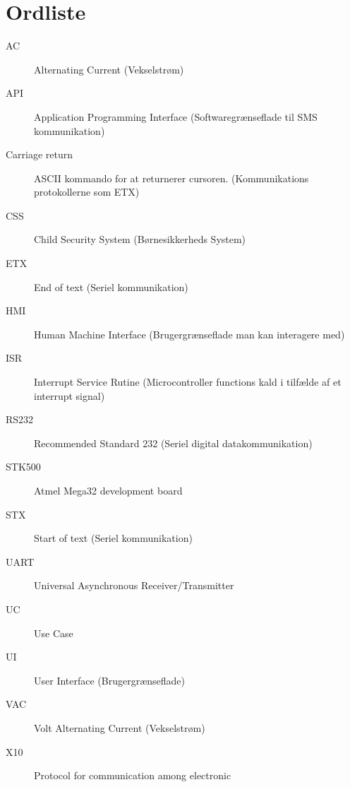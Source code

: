 \chapter{Ordliste}

\begin{description}

\item[AC] Alternating Current (Vekselstrøm)
\item[API] Application Programming Interface (Softwaregrænseflade til SMS kommunikation)
\item[Carriage return] ASCII kommando for at returnerer cursoren. (Kommunikations protokollerne som ETX)
\item[CSS] Child Security System (Børnesikkerheds System)
\item[ETX] End of text (Seriel kommunikation)
\item[HMI] Human Machine Interface (Brugergrænseflade man kan interagere med)
\item[ISR] Interrupt Service Rutine (Microcontroller functions kald i tilfælde af et interrupt signal)
\item[RS232] Recommended Standard 232 (Seriel digital datakommunikation)
\item[STK500] Atmel Mega32 development board
\item[STX] Start of text (Seriel kommunikation)
\item[UART] Universal Asynchronous Receiver/Transmitter
\item[UC] Use Case
\item[UI] User Interface (Brugergrænseflade)
\item[VAC] Volt Alternating Current (Vekselstrøm)
\item[X10] Protocol for communication among electronic

\end{description}
